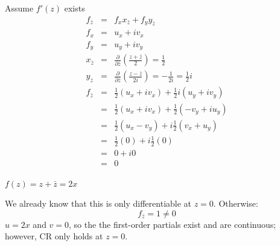 \documentclass[letterpaper,12pt,fleqn]{article}
\newcommand{\zb}{\bar{z}}
\newcommand{\pzb}{\partial\zb}
\begin{document}
\begin{theproof}
  Assume $f'(z)$ exists
  \begin{eqnarray*}
    f_{\zb} &=& f_xx_{\zb}+f_yy_{\zb} \\
    f_x &=& u_x+iv_x \\
    f_y &=& u_y+iv_y \\
    x_{\zb} &=& \frac{\partial}{\pzb}\left(\frac{z+\zb}{2}\right)=\frac{1}{2} \\
    y_{\zb} &=& \frac{\partial}{\pzb}\left(\frac{z-\zb}{2i}\right)=
    -\frac{1}{2i}=\frac{1}{2}i \\
    f_{\zb} &=& \frac{1}{2}(u_x+iv_x)+\frac{1}{2}i(u_y+iv_y) \\
    &=& \frac{1}{2}(u_x+iv_x)+\frac{1}{2}(-v_y+iu_y) \\
    &=& \frac{1}{2}(u_x-v_y)+i\frac{1}{2}(v_x+u_y) \\
    &=& \frac{1}{2}(0)+i\frac{1}{2}(0) \\
    &=& 0+i0 \\
    &=& 0 \\
  \end{eqnarray*}
\end{theproof}

\begin{example}
  $f(z)=z+\zb=2x$

  We already know that this is only differentiable at $z=0$. Otherwise:
  \[f_{\zb}=1\ne0\]
  $u=2x$ and $v=0$, so the the first-order partials exist and are continuous;
  however, CR only holds at $z=0$.
\end{example}
\end{document}
